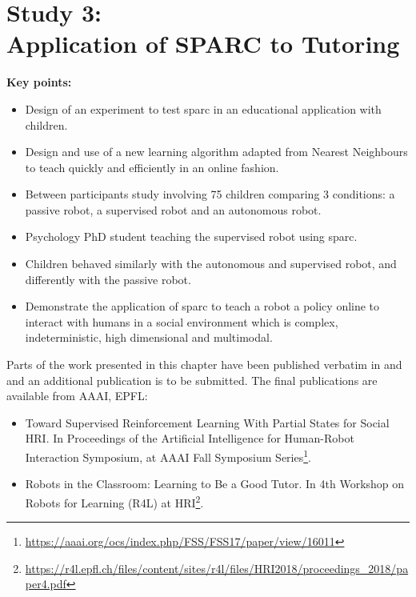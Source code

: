 \chapter[Study 3: Application of SPARC to Tutoring]{Study 3: \\Application of SPARC to Tutoring}\label{chap:tutoring}
\glsresetall
\graphicspath{{images/tutoring/}}

\begin{framed}
	\textbf{Key points:}
	
	\begin{itemize}
		\item Design of an experiment to test \acrshort{sparc} in an educational application with children.
		\item Design and use of a new learning algorithm adapted from Nearest Neighbours to teach quickly and efficiently in an online fashion.
		\item Between participants study involving 75 children comparing 3 conditions: a passive robot, a supervised robot and an autonomous robot.
		\item Psychology PhD student teaching the supervised robot using \acrshort{sparc}.
		\item Children behaved similarly with the autonomous and supervised robot, and differently with the passive robot.
		\item Demonstrate  the application of \acrshort{sparc} to teach a robot a policy online to interact with humans in a social environment which is complex, indeterministic, high dimensional and multimodal.
	\end{itemize}
\end{framed}

Parts of the work presented in this chapter have been published verbatim in \cite{senft2017toward} and \cite{senft2018robots} and an additional publication is to be submitted. The final publications are available from AAAI, EPFL:
\begin{itemize}
	\item Toward Supervised
	Reinforcement Learning With Partial States for Social HRI. In Proceedings of the Artificial Intelligence for Human-Robot Interaction Symposium, at AAAI Fall Symposium Series\footnote{\url{https://aaai.org/ocs/index.php/FSS/FSS17/paper/view/16011}}.
	\item Robots in the Classroom: Learning to Be a Good Tutor. In 4th Workshop on Robots for Learning (R4L) at HRI\footnote{\url{https://r4l.epfl.ch/files/content/sites/r4l/files/HRI2018/proceedings_2018/paper4.pdf}}.
\end{itemize} 

